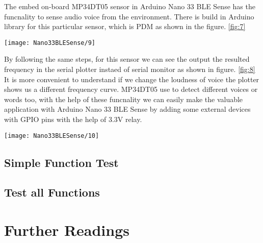 The embed on-board MP34DT05 sensor in Arduino Nano 33 BLE Sense has the funcnality to sense audio voice from the environment. There is build in Arduino library for this particular sensor, which is PDM as shown in the figure.  \ref{fig:7}

\begin{center}
    \texttt{[image: Nano33BLESense/9]}
    \label{fig:7}
\end{center}

By following the same steps, for this sensor we can see the output the resulted frequency in the serial plotter instaed of serial monitor as shown in figure.  \ref{fig:8}  It is more convenient to understand if we change the loudness of voice the plotter shows us a different frequency curve. MP34DT05 use to detect different voices or words too, with the help of these funcnality we can easily make the valuable application with Arduino Nano 33 BLE Sense by adding some external devices with GPIO pins with the help of 3.3V relay.

\begin{center}
    \texttt{[image: Nano33BLESense/10]}
    \label{fig:8}
\end{center}

\subsection{Simple Function Test}

\subsection{Test all Functions}




\section{Further Readings}





